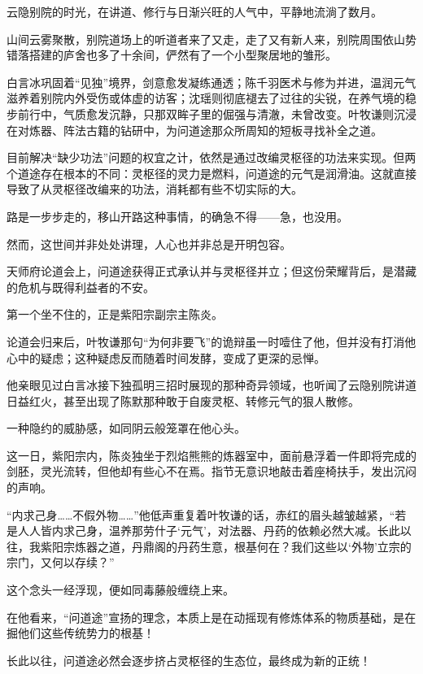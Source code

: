 \vspace{2em}

云隐别院的时光，在讲道、修行与日渐兴旺的人气中，平静地流淌了数月。

山间云雾聚散，别院道场上的听道者来了又走，走了又有新人来，别院周围依山势错落搭建的庐舍也多了十余间，俨然有了一个小型聚居地的雏形。

白言冰巩固着“见独”境界，剑意愈发凝练通透；陈千羽医术与修为并进，温润元气滋养着别院内外受伤或体虚的访客；沈瑶则彻底褪去了过往的尖锐，在养气境的稳步前行中，气质愈发沉静，只那双眸子里的倔强与清澈，未曾改变。叶牧谦则沉浸在对炼器、阵法古籍的钻研中，为问道途那众所周知的短板寻找补全之道。

目前解决“缺少功法”问题的权宜之计，依然是通过改编灵枢径的功法来实现。但两个道途存在根本的不同：灵枢径的灵力是燃料，问道途的元气是润滑油。这就直接导致了从灵枢径改编来的功法，消耗都有些不切实际的大。

路是一步步走的，移山开路这种事情，的确急不得——急，也没用。

\vspace{2em}

然而，这世间并非处处讲理，人心也并非总是开明包容。

天师府论道会上，问道途获得正式承认并与灵枢径并立；但这份荣耀背后，是潜藏的危机与既得利益者的不安。

第一个坐不住的，正是紫阳宗副宗主陈炎。

论道会归来后，叶牧谦那句“为何非要飞”的诡辩虽一时噎住了他，但并没有打消他心中的疑虑；这种疑虑反而随着时间发酵，变成了更深的忌惮。

他亲眼见过白言冰接下独孤明三招时展现的那种奇异领域，也听闻了云隐别院讲道日益红火，甚至出现了陈默那种敢于自废灵枢、转修元气的狠人散修。

一种隐约的威胁感，如同阴云般笼罩在他心头。

这一日，紫阳宗内，陈炎独坐于烈焰熊熊的炼器室中，面前悬浮着一件即将完成的剑胚，灵光流转，但他却有些心不在焉。指节无意识地敲击着座椅扶手，发出沉闷的声响。

“内求己身……不假外物……”他低声重复着叶牧谦的话，赤红的眉头越皱越紧，“若是人人皆内求己身，温养那劳什子‘元气’，对法器、丹药的依赖必然大减。长此以往，我紫阳宗炼器之道，丹鼎阁的丹药生意，根基何在？我们这些以‘外物’立宗的宗门，又何以存续？”

这个念头一经浮现，便如同毒藤般缠绕上来。

在他看来，“问道途”宣扬的理念，本质上是在动摇现有修炼体系的物质基础，是在掘他们这些传统势力的根基！

长此以往，问道途必然会逐步挤占灵枢径的生态位，最终成为新的正统！

